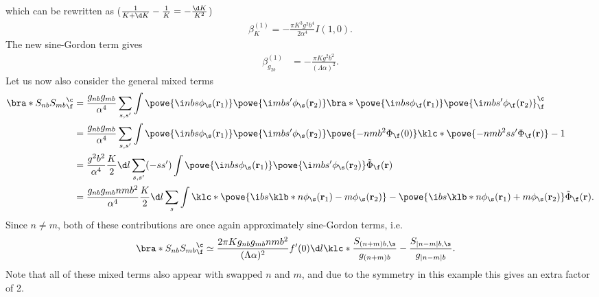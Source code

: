 \documentclass[english, parskip=full]{scrartcl}
\begin{document}
which can be rewritten as ($\frac{1}{K+\d K} - \frac{1}{K} = -\frac{\d K}{K^2}$)
\begin{align}
\beta_K^{(1)} = -\frac{\pi K^3g^2b^4}{2\alpha^4} I(1,0).
\end{align}
The new sine-Gordon term gives
\begin{align}
\beta_{g_{2b}}^{(1)} &= -\frac{\pi K g^2b^2}{(\Lambda\alpha)^2}.
\end{align}
Let us now also consider the general mixed terms
\begin{align}
\bra*{S_{nb} S_{mb}}_\f^\c &= \frac{g_{nb} g_{mb}}{\alpha^4} \sum_{s,s'} \int \powe{\i nbs\phi_\s(\textbf{r}_1)} \powe{\i mbs'\phi_\s(\textbf{r}_2)} \bra*{\powe{\i nbs\phi_\f(\textbf{r}_1)} \powe{\i mbs' \phi_\f(\textbf{r}_2)}}_\f^\c\\
&= \frac{g_{nb} g_{mb}}{\alpha^4} \sum_{s,s'} \int \powe{\i nbs\phi_\s(\textbf{r}_1)} \powe{\i mbs'\phi_\s(\textbf{r}_2)} \powe{-nmb^2\Phi_\f(0)} \klc*{\powe{-nmb^2ss' \Phi_\f(\textbf{r})} - 1 }\\
&=\frac{g^2 b^2}{\alpha^4} \frac{K}{2}\d l \sum_{s,s'} (-ss') \int \powe{\i nbs\phi_\s(\textbf{r}_1)} \powe{\i mbs'\phi_\s(\textbf{r}_2)} \tilde{\Phi}_\f(\textbf{r})\\
&= \frac{g_{nb} g_{mb} nm b^2}{\alpha^4} \frac{K}{2} \d l \sum_s \int \klc*{\powe{\i bs \klb*{n\phi_\s(\textbf{r}_1) - m\phi_\s(\textbf{r}_2)}} - \powe{\i bs \klb*{n\phi_\s(\textbf{r}_1) + m\phi_\s(\textbf{r}_2)}}} \tilde{\Phi}_\f(\textbf{r}).
\end{align}
Since $n\neq m$, both of these contributions are once again approximately sine-Gordon terms, i.e.
\begin{align}
\bra*{S_{nb} S_{mb}}_\f^\c &\simeq \frac{2\pi K g_{nb} g_{mb} nm b^2}{(\Lambda\alpha)^2} f'(0) \d l  \klc*{\frac{S_{(n+m)b,\s}}{g_{(n+m)b}} - \frac{S_{|n-m|b,\s}}{g_{|n-m|b}}}.
\end{align}
Note that all of these mixed terms also appear with swapped $n$ and $m$, and due to the symmetry in this example this gives an extra factor of 2.
\end{document}
